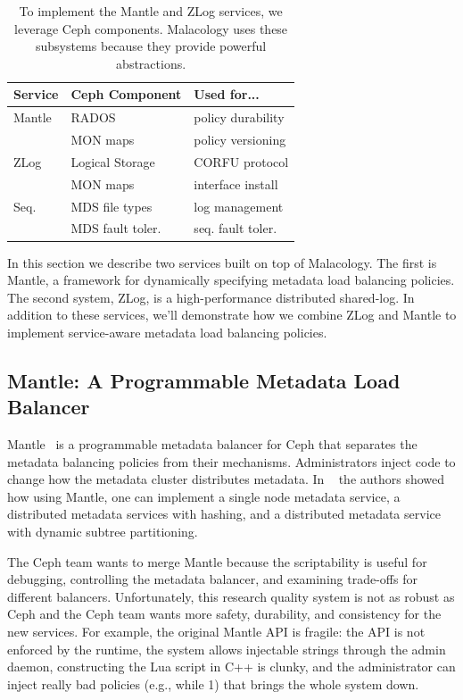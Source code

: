 \documentclass[10pt,twocolumn]{article}
\begin{document}
\begin{table}
\centering
\begin{tabular}{  l | l | l    }
\textbf{Service} & \textbf{Ceph Component} & \textbf{Used for...}  \\ \hline
Mantle  & RADOS    & policy durability \\
        & MON maps & policy versioning \\ \hline
ZLog    & Logical Storage & CORFU protocol  \\ 
        & MON maps & interface install \\ \hline
Seq.    & MDS file types & log management \\ 
        & MDS fault toler. & seq. fault toler. \\
\end{tabular}
\caption{To implement the Mantle and ZLog services, we leverage Ceph components. Malacology uses these subsystems because they provide powerful abstractions.}
\label{table:implementation}
\end{table}

In this section we describe two services built on top of Malacology. The first
is Mantle, a framework for dynamically specifying metadata load balancing
policies. The second system, ZLog, is a high-performance distributed shared-log.
In addition to these services, we'll demonstrate how we combine ZLog and Mantle
to implement service-aware metadata load balancing policies.

\subsection{Mantle: A Programmable Metadata Load Balancer}
\label{sec:mantle}

Mantle~\cite{sevilla:sc15-mantle} is a programmable metadata
balancer for Ceph that separates the metadata balancing policies from their
mechanisms. Administrators inject code to change how the metadata cluster
distributes metadata. In ~\cite{sevilla:sc15-mantle} the authors showed how 
using Mantle, one can implement a single node metadata service, a distributed 
metadata services with hashing, and a distributed metadata service with dynamic 
subtree partitioning.

The Ceph team wants to merge Mantle because the scriptability is useful
for debugging, controlling the metadata balancer, and examining
trade-offs for different balancers. Unfortunately, this research quality
system is not as robust as Ceph and the Ceph team wants more safety,
durability, and consistency for the new services. For example, the
original Mantle API is fragile: the API is not enforced by the runtime,
the system allows injectable strings through the admin daemon,
constructing the Lua script in C++ is clunky, and the administrator can
inject really bad policies (e.g., while 1) that brings the whole system
down.
\end{document}
